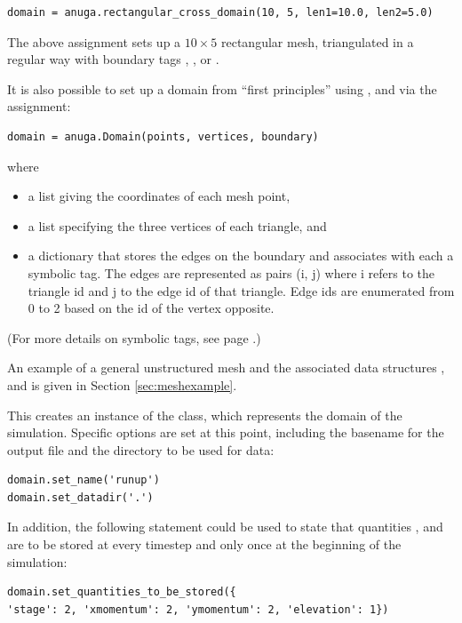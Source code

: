 \documentclass{manual}
\begin{document}
\begin{verbatim}
domain = anuga.rectangular_cross_domain(10, 5, len1=10.0, len2=5.0) 
\end{verbatim}
%
The above assignment sets up a $10 \times
5$ rectangular mesh, triangulated in a regular way with boundary tags , ,
          or . 

It is also possible to set up a domain from ``first principles'' using ,  and  via the assignment:
\begin{verbatim}
domain = anuga.Domain(points, vertices, boundary)
\end{verbatim}
where
\begin{itemize}
   \item a list  giving the coordinates of each mesh point,
   \item a list  specifying the three vertices of each triangle, and
   \item a dictionary  that stores the edges on
         the boundary and associates with each a symbolic tag. The edges are represented as pairs (i, j) where i refers to the triangle id and j to the edge id of that triangle. 
         Edge ids are enumerated from 0 to 2 based on the id of the vertex opposite. 
\end{itemize}

(For more details on symbolic tags, see page
\pageref{ref:tagdescription}.)

An example of a general unstructured mesh and the associated data
structures ,  and  is
given in Section \ref{sec:meshexample}.



This creates an instance of the  class, which
represents the domain of the simulation. Specific options are set at
this point, including the basename for the output file and the
directory to be used for data:

\begin{verbatim}
domain.set_name('runup')
domain.set_datadir('.')
\end{verbatim}

In addition, the following statement could be used to state that
quantities ,  and  are
to be stored at every timestep and  only once at 
the beginning of the simulation:

\begin{verbatim}
domain.set_quantities_to_be_stored({
'stage': 2, 'xmomentum': 2, 'ymomentum': 2, 'elevation': 1})
\end{verbatim}
\end{document}
